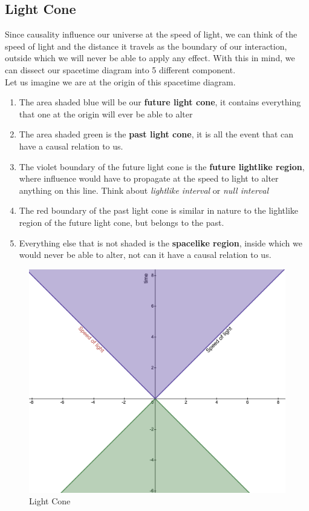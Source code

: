 \documentclass[12pt]{book}
\begin{document}
\newpage 

\subsection{Light Cone}
Since causality influence our universe at the speed of light, we can think of the speed of light and the distance it travels as the boundary of our interaction, outside which we will never be able to apply any effect. With this in mind, we can dissect our spacetime diagram into 5 different component. \\
\newline
Let us imagine we are at the origin of this spacetime diagram.
\begin{enumerate}
    \item The area shaded blue will be our \textbf{future light cone}, it contains everything that one at the origin will ever be able to alter
    \item The area shaded green is the \textbf{past light cone}, it is all the event that can have a causal relation to us.
    \item The violet boundary of the future light cone is the \textbf{future lightlike region}, where influence would have to propagate at the speed to light to alter anything on this line. Think about \textit{lightlike interval} or \textit{null interval}
    \item The red boundary of the past light cone is similar in nature to the lightlike region of the future light cone, but belongs to the past.
    \item Everything else that is not shaded is the \textbf{spacelike region}, inside which we would never be able to alter, not can it have a causal relation to us. 
\end{enumerate}

\begin{figure}[!h]
    \centering
    \includegraphics[width=0.5\linewidth]{picture/Light Cone.png}
    \caption{Light Cone}
    \label{fig:lightcone}
\end{figure}
\end{document}
